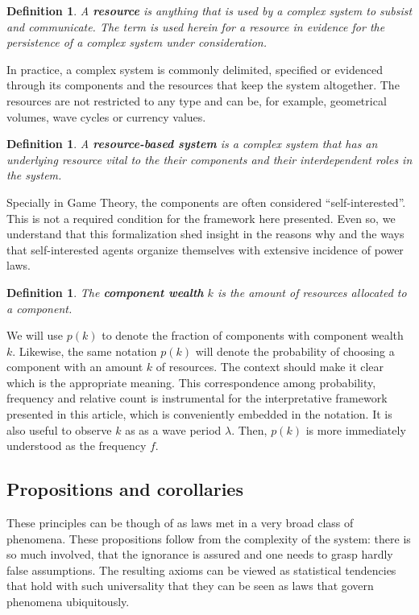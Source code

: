\documentclass[a4paper, 11pt]{article} %
\newtheorem{definition2}[theorem3]{Definition}
\begin{document}
\begin{definition2}
	A {\bf resource} is anything that is used by a complex system to subsist and communicate. The term is used herein for a resource in evidence for the persistence of a complex system under consideration.
\end{definition2}

In practice, a complex system is commonly delimited, specified or evidenced through its components and the resources that keep the system altogether.
The resources are not restricted to any type
and can be, for example, geometrical volumes,
wave cycles or currency values.

\begin{definition2}
	A {\bf resource-based system} is a complex system that has an underlying resource vital to the their components and their interdependent roles in the system.
\end{definition2}

Specially in Game Theory, the components are often considered
``self-interested''. This is not a required condition for the 
framework here presented.
Even so, we understand that this formalization shed insight
in the reasons why and the ways that self-interested agents
organize themselves
with extensive incidence of power laws.

\begin{definition2}
	The {\bf component wealth} $k$ is the amount of resources allocated to a component.
\end{definition2}

We will use $p(k)$ to denote the fraction of components with component wealth $k$. Likewise, the same notation $p(k)$ will denote the probability of choosing a component with an amount $k$ of resources.
The context should make it clear which is the appropriate meaning.
This correspondence among probability, frequency and relative count is
instrumental for the interpretative framework presented in this article,
which is conveniently embedded in the notation.
It is also useful to observe 
$k$ as as a wave period $\lambda$.
Then, $p(k)$ is more immediately understood as 
the
frequency
$f$.


\subsection{Propositions and corollaries}

These principles can be though of as laws met in
a very broad class of phenomena.
These propositions follow from the complexity of the system:
there is so much involved, that the ignorance is assured and
one needs to grasp hardly false assumptions.
The resulting axioms can be viewed as statistical tendencies that
hold with such universality that they can be seen as laws
that govern phenomena ubiquitously.
\end{document}

